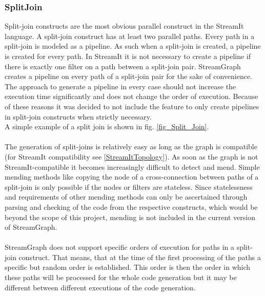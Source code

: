 \documentclass[journal]{IEEEtran}
\begin{document}
\subsubsection{SplitJoin}
\noindent Split-join constructs are the most obvious parallel construct in the
StreamIt language. A split-join construct has at least two parallel paths. Every
path in a split-join is modeled as a pipeline. As such when a split-join is
created, a pipeline is created for every path. In StreamIt it is
not necessary to create a pipeline if there is exactly one filter on a path
between a split-join pair. StreamGraph creates a pipeline on every path of a
split-join pair for the sake of convenience. The approach to generate a
pipeline in every case should not increase the execution time significantly and
does not change the order of execution. Because of these reasons it was decided
to not include the feature to only create pipelines in split-join constructs
when strictly necessary.\\
A simple example of a split join is shown in fig. \ref{fig_Split_Join}.\\
\\
The generation of split-joins is relatively easy as long as the graph is compatible
(for StreamIt compatibility see \ref{StreamItTopology}). As soon as the graph is not 
StreamIt-compatible it becomes increasingly difficult to detect and mend. Simple 
mending methods like copying the node of a cross-connection between paths of a 
split-join is only possible if the nodes or filters are stateless. Since 
statelessness and requirements of other mending methods can only be ascertained 
through parsing and checking of the code from the respective constructs, which would be beyond 
the scope of this project, mending is not included in the current version of StreamGraph.\\
\\
StreamGraph does not support specific orders of execution for paths in a split-join 
construct. That means, that at the time of the first processing of the paths a specific
but random order is established. This order is then the order in which these paths will 
be processed for the whole code generation but it may be different between different
executions of the code generation.\\
\end{document}
